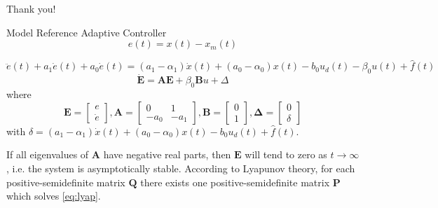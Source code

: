 \documentclass[10pt]{beamer}
\begin{document}
\begin{frame}[standout]
   Thank you!
\end{frame}

\appendix

\begin{frame}{Model Reference Adaptive Controller}
  \begin{equation*}
    \label{eq:stateerror}
    e(t) = x(t) - x_m(t)
  \end{equation*}

  \begin{equation*}
    \ddot{e}(t) + a_1\dot{e}(t) + a_0\dot{e}(t) =  (a_1-\alpha_1)\dot{x}(t) + (a_0-\alpha_0)x(t) - b_0u_d(t) - \beta_0u(t) + \hat{f}(t)
  \end{equation*}
  \begin{equation*}
    \label{eq:stateSpaceError}
    \mathbf{\dot{E} = AE} + \beta_0\mathbf{B}u + \Delta
  \end{equation*}
  where
  \begin{equation*}
    \label{eq:matrices}
    \mathbf{E} =
      \begin{bmatrix}
         e\\[0.3em]
         \dot{e}
       \end{bmatrix},
    \mathbf{A} =
      \begin{bmatrix}
         0 & 1\\[0.3em]
         -a_0 & -a_1
       \end{bmatrix},
    \mathbf{B} =
      \begin{bmatrix}
          0\\[0.3em]
          1
      \end{bmatrix},
      \mathbf{\Delta} =
        \begin{bmatrix}
            0\\[0.3em]
            \delta
        \end{bmatrix}
  \end{equation*}
  with $\delta = (a_1-\alpha_1)\dot{x}(t) + (a_0-\alpha_0)x(t) - b_0u_d(t) + \hat{f}(t)$.

  If all eigenvalues of $\mathbf{A}$ have negative real parts, then $\mathbf{E}$ will tend to zero as  $t \to \infty$, i.e. the system is asymptotically stable. According to Lyapunov theory, for each positive-semidefinite matrix $\mathbf{Q}$ there exists one positive-semidefinite matrix $\mathbf{P}$ which solves \eqref{eq:lyap}.
\end{frame}
\end{document}
